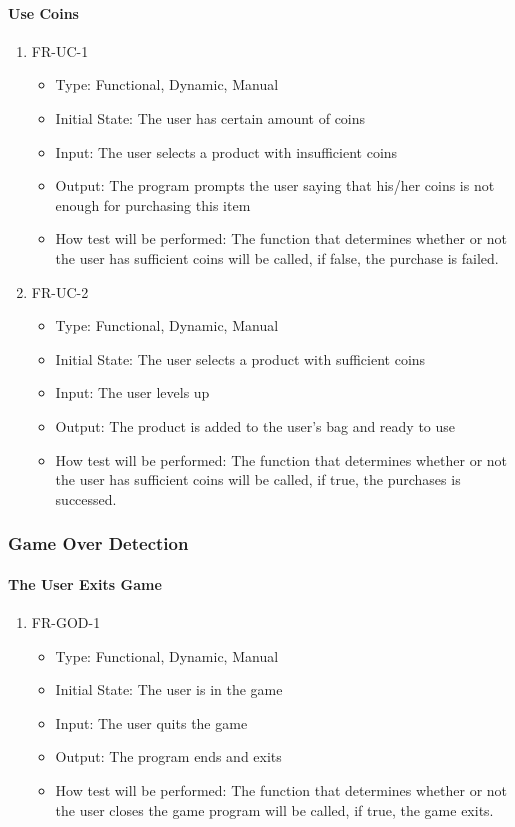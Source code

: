 \documentclass[12,english]{article}
\begin{document}
\paragraph{Use Coins}
\begin{enumerate}
  \item FR-UC-1
  \begin{itemize}
      \item Type: Functional, Dynamic, Manual
      \item Initial State: The user has certain amount of coins
      \item Input: The user selects a product with insufficient coins 
      \item Output: The program prompts the user saying that his/her coins is not enough for purchasing this item
      \item How test will be performed:  The function that determines whether or not the user has sufficient coins will be called, if false, the purchase is failed.
  \end{itemize}
  \item FR-UC-2
  \begin{itemize}
      \item Type: Functional, Dynamic, Manual
      \item Initial State: The user selects a product with sufficient coins
      \item Input: The user levels up
      \item Output: The product is added to the user’s bag and ready to use
      \item How test will be performed: The function that determines whether or not the user has sufficient coins will be called, if true, the purchases is successed.   
  \end{itemize}
\end{enumerate}

\subsubsection{Game Over Detection}
\paragraph{The User Exits Game}
\begin{enumerate}
  \item FR-GOD-1
  \begin{itemize}
      \item Type: Functional, Dynamic, Manual
      \item Initial State: The user is in the game 
      \item Input: The user quits the game
      \item Output: The program ends and exits
      \item How test will be performed: The function that determines whether or not the user closes the game program will be called, if true, the game exits.
  \end{itemize}
\end{enumerate}
\end{document}
